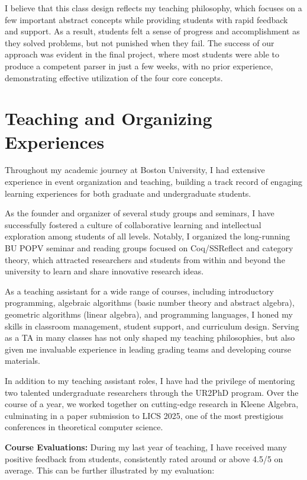 \documentclass[11pt,a4paper,sans]{moderncv} %
\begin{document}
I believe that this class design reflects my teaching philosophy, which focuses on a few important abstract concepts while providing students with rapid feedback and support. 
As a result, students felt a sense of progress and accomplishment as they solved problems, but not punished when they fail. 
The success of our approach was evident in the final project, where most students were able to produce a competent parser in just a few weeks, with no prior experience, demonstrating effective utilization of the four core concepts.

\section{Teaching and Organizing Experiences}

Throughout my academic journey at Boston University, I had extensive experience in event organization and teaching, building a track record of engaging learning experiences for both graduate and undergraduate students.

As the founder and organizer of several study groups and seminars, I have successfully fostered a culture of collaborative learning and intellectual exploration among students of all levels. 
Notably, I organized the long-running BU POPV seminar and reading groups focused on Coq/SSReflect and category theory, which attracted researchers and students from within and beyond the university to learn and share innovative research ideas.

As a teaching assistant for a wide range of courses, including introductory programming, algebraic algorithms (basic number theory and abstract algebra), geometric algorithms (linear algebra), and programming languages, I honed my skills in classroom management, student support, and curriculum design. 
Serving as a TA in many classes has not only shaped my teaching philosophies, but also given me invaluable experience in leading grading teams and developing course materials.

In addition to my teaching assistant roles, I have had the privilege of mentoring two talented undergraduate researchers through the UR2PhD program. 
Over the course of a year, we worked together on cutting-edge research in Kleene Algebra, culminating in a paper submission to LICS 2025, one of the most prestigious conferences in theoretical computer science.

\textbf{Course Evaluations:}
During my last year of teaching, I have received many positive feedback from students, consistently rated around or above 4.5/5 on average. 
This can be further illustrated by my evaluation:
\end{document}

